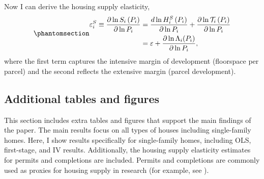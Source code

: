 \documentclass[
  12pt,
]{article}
\begin{document}
Now I can derive the housing supply elasticity,
\begin{equation}\protect\phantomsection\label{eq-elasticity-appendix}{
\begin{aligned}
\varepsilon^S_{i} \equiv \frac{\partial \ln S_{i}\left(P_{i}\right)}{\partial \ln P_{i}}&=\frac{d \ln H^S_{i}\left(P_{i}\right)}{\partial \ln P_{i}}+ \frac{\partial \ln \mathcal{T}_{i}\left(P_{i}\right)}{\partial \ln P_{i}} \\
&= \varepsilon + \frac{\partial \ln\Lambda_i(P_i)}{\partial \ln P_i},
\end{aligned}
}\end{equation} where the first term captures the intensive margin of
development (floorspace per parcel) and the second reflects the
extensive margin (parcel development).

\subsection{Additional tables and
figures}\label{additional-tables-and-figures}

This section includes extra tables and figures that support the main
findings of the paper. The main results focus on all types of houses
including single-family homes. Here, I show results specifically for
single-family homes, including OLS, first-stage, and IV results.
Additionally, the housing supply elasticity estimates for permits and
completions are included. Permits and completions are commonly used as
proxies for housing supply in research (for example, see
\citet{lerbs_2014}).
\end{document}
